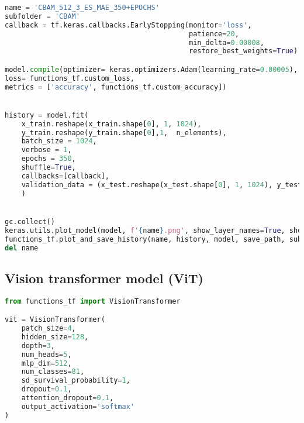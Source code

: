 \begin{lstlisting}[language=Python]
name = 'CBAM_512_3_ES_MAE_350+EPOCHS'
subfolder = 'CBAM'
callback = tf.keras.callbacks.EarlyStopping(monitor='loss', 
                                            patience=20,
                                            min_delta=0.00008,
                                            restore_best_weights=True)

model.compile(optimizer= keras.optimizers.Adam(learning_rate=0.00005),
loss= functions_tf.custom_loss,
metrics = ['accuracy', functions_tf.custom_accuracy])


history = model.fit(
    x_train.reshape(x_train.shape[0], 1, 1024),
    y_train.reshape(y_train.shape[0],1,  n_elements),
    batch_size = 1024,
    verbose = 1,
    epochs = 350,
    shuffle=True,
    callbacks=[callback],
    validation_data = (x_test.reshape(x_test.shape[0], 1, 1024), y_test.reshape(y_test.shape[0],1,  n_elements))
    )


gc.collect()
keras.utils.plot_model(model, f'{name}.png', show_layer_names=True, show_layer_activations=True, show_shapes=True)
functions_tf.plot_and_save_history(name, history, model, save_path, subfolder=subfolder, plot_acc=False)
del name
\end{lstlisting}


\hypertarget{vision-transformer-model-vit}{%
\subsection*{Vision transformer model
(ViT)}\label{vision-transformer-model-vit}}

\begin{lstlisting}[language=Python]
from functions_tf import VisionTransformer

vit = VisionTransformer(
    patch_size=4,
    hidden_size=128,
    depth=3,
    num_heads=5,
    mlp_dim=512,
    num_classes=81,
    sd_survival_probability=1,
    dropout=0.1,
    attention_dropout=0.1,
    output_activation='softmax'
)
\end{lstlisting}

